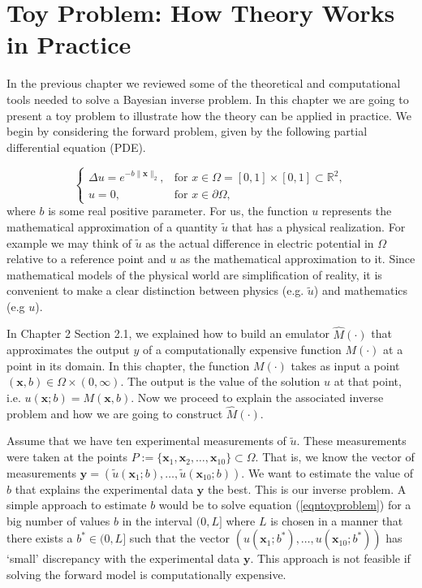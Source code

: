 \documentclass[12pt]{book}
\newcommand{\x}{\textbf{x}}
\newcommand{\y}{\textbf{y}}
\begin{document}
\chapter{Toy Problem: How Theory Works in Practice}

In the previous chapter we reviewed some  of the theoretical and computational tools needed to solve
a Bayesian inverse problem. In this chapter
we are going to present  a toy problem to illustrate how the theory  can be applied in practice.
We begin by considering the forward problem, given by the following partial differential equation (PDE).

\begin{equation}\label{eqntoyproblem}
\left\{
	\begin{array}{ll}
		\Delta u=e^{-b\|\x\|_{2}}, &\mbox{for } x\in\Omega=[0,1]\times [0,1]\subset\mathbb{R}^{2}, \\
		u=0, & \mbox{for } x\in\partial\Omega,
	\end{array}
\right.
\end{equation} 
where $b$ is some real positive parameter. For us, the 
function $u$ represents the mathematical approximation of  a quantity $\tilde{u}$ that has a physical realization. 
For example we may think of $\tilde{u}$ as the actual difference in  electric potential in $\Omega$ relative to a reference point
and $u$ as the mathematical approximation to it. Since mathematical models of the physical world are  simplification
of  reality, it is convenient to make a clear distinction between physics (e.g. $\tilde{u}$) and mathematics (e.g $u$).

In Chapter 2 Section 2.1, we explained how to build an emulator $\hat{M}(\cdot)$  that approximates
the output $y$  of a computationally expensive function  $M(\cdot)$ at a point  in its domain. 
In  this chapter, the function $M(\cdot)$ takes as input a point  $(\textbf{x},b)\in\Omega\times(0,\infty)$. The
output is the value of the solution $u$ at that 
point, i.e. $u(\textbf{x};b)=M(\textbf{x},b)$. Now we proceed to explain the associated inverse problem and  how we are going to construct $\hat{M}(\cdot)$.  

Assume that we have ten experimental measurements 
of $\tilde{u}$. These measurements were taken  at the points $P:=\{\x_{1},\x_{2},\ldots,\x_{10}\}\subset\Omega$. 
That is, we know the vector of measurements 
$\textbf{y}=(\tilde{u}(\x_{1};b),\ldots,\tilde{u}(\x_{10};b))$.
We want to estimate the value of $b$ that explains  the experimental data $\textbf{y}$ the best. 
This is our inverse problem. 
A simple approach to estimate $b$ 
would be to solve equation (\ref{eqntoyproblem}) for a big number of values $b$ in the interval $(0,L]$ where $L$ 
is chosen in a manner that there exists a $b^{*}\in (0,L]$ such that the vector 
$(u(\x_{1};b^{*}),\ldots,u(\x_{10};b^{*}))$
has `small' discrepancy with the experimental data $\y$. This approach is not feasible if solving the forward
model is computationally expensive. 
\end{document}

